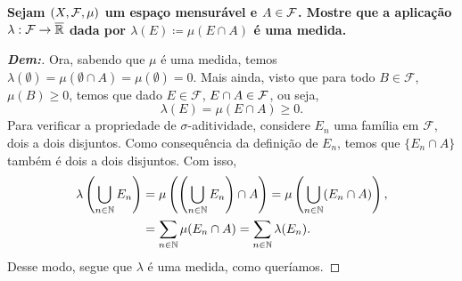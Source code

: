 \myexe{\thedois}
\bigline
\textbf{Sejam $(X, \mathcal F, \mu)$ um espaço mensurável e $A \in \mathcal F$. 
Mostre que a aplicação $\lambda: \mathcal F \rightarrow \overline {\mathbb R}$ dada por 
$\lambda(E)\coloneq \mu(E \cap A)$ é uma medida.}
\begin{proof}[\textbf{Dem:}]
Ora, sabendo que $\mu$ é uma medida, temos 
$\lambda(\emptyset) = \mu(\emptyset \cap A) = \mu(\emptyset) = 0$. Mais ainda, 
visto que para todo $B \in \mathcal F$, $\mu(B) \ge 0$, temos que dado $E \in \mathcal F$,
$E \cap A \in \mathcal F$, ou seja, 
$$\lambda(E) = \mu(E \cap A) \ge 0.$$ 
Para verificar a propriedade de $\sigma$-aditividade, considere ${E_n}$ uma família em 
$\mathcal F$, dois a dois disjuntos. Como consequência da definição de ${E_n}$, temos que 
$\{E_n \cap A\}$ também é dois a dois disjuntos. Com isso,
\begin{align*}
   \lambda\left(\bigcup\limits_{n \in \mathbb N} E_n\right) &= 
   \mu\left(\left(\bigcup\limits_{n \in \mathbb N} E_n\right)\cap A\right) = 
   \mu\left(\bigcup\limits_{n \in \mathbb N} (E_n \cap A)\right),\\
   &=\sum_{n \in \mathbb N}\mu(E_n \cap A)=\sum_{n\in\mathbb N}\lambda(E_n).
\end{align*}
Desse modo, segue que $\lambda$ é uma medida, como queríamos.
\end{proof}
\biglinend


